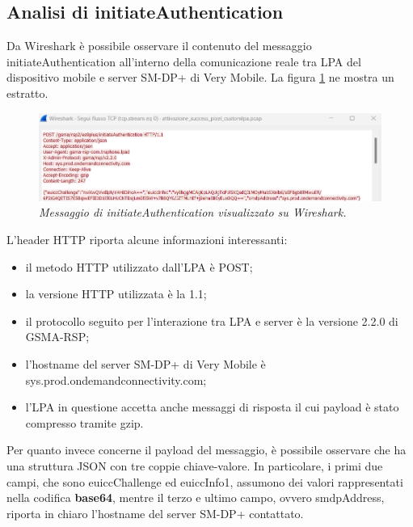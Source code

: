 \documentclass[10pt, oneside]{book}
\begin{document}
\subsection{Analisi di initiateAuthentication}
Da Wireshark è possibile osservare il contenuto del messaggio initiateAuthentication all'interno della comunicazione reale tra LPA del dispositivo mobile e server SM-DP+ di Very Mobile. La figura \ref{fig:msg1-stream-pcap} ne mostra un estratto.\\
\begin{figure}
\includegraphics[width=\linewidth]{msg1-stream-pcap.png}
\caption{\textit{Messaggio di initiateAuthentication visualizzato su Wireshark.}}
\label{fig:msg1-stream-pcap}
\end{figure}
L'header HTTP riporta alcune informazioni interessanti:
\begin{itemize}
\item il metodo HTTP utilizzato dall'LPA è POST;
\item la versione HTTP utilizzata è la 1.1;
\item il protocollo seguito per l'interazione tra LPA e server è la versione 2.2.0 di GSMA-RSP;
\item l'hostname del server SM-DP+ di Very Mobile è sys.prod.ondemandconnectivity.com;
\item l'LPA in questione accetta anche messaggi di risposta il cui payload è stato compresso tramite gzip.
\end{itemize}
Per quanto invece concerne il payload del messaggio, è possibile osservare che ha una struttura JSON con tre coppie chiave-valore. In particolare, i primi due campi, che sono euiccChallenge ed euiccInfo1, assumono dei valori rappresentati nella codifica \textbf{base64}, mentre il terzo e ultimo campo, ovvero smdpAddress, riporta in chiaro l'hostname del server SM-DP+ contattato.
\end{document}
